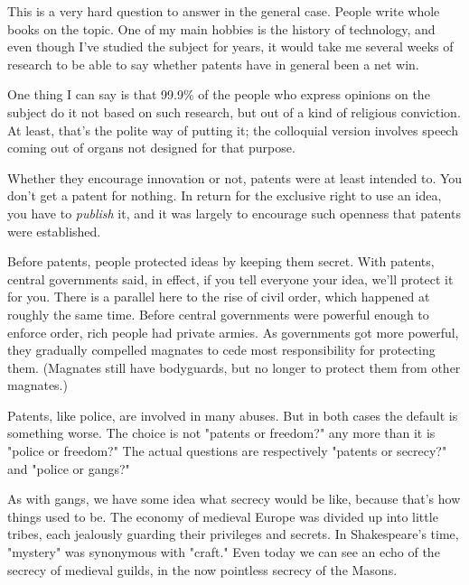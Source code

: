 This is a very hard question to answer
                  in the general case. People write whole books on the topic.
                  One of my main hobbies is the history of technology, and even
                  though I've studied the subject for years, it would take me
                  several weeks of research to be able to say whether patents
                  have in general been a net win.

One thing I can say
                  is that 99.9\% of the people who express opinions on the
                  subject do it not based on such research, but out of a kind of
                  religious conviction. At least, that's the polite way of
                  putting it; the colloquial version involves speech coming out
                  of organs not designed for that purpose.

Whether
                  they encourage innovation or not, patents were at least
                  intended to. You don't get a patent for nothing. In return for
                  the exclusive right to use an idea, you have to
                  \emph{publish} it, and it was largely to encourage such
                  openness that patents were established.

Before
                  patents, people protected ideas by keeping them secret. With
                  patents, central governments said, in effect, if you tell
                  everyone your idea, we'll protect it for you. There is a
                  parallel here to the rise of civil order, which happened at
                  roughly the same time. Before central governments were
                  powerful enough to enforce order, rich people had private
                  armies. As governments got more powerful, they gradually
                  compelled magnates to cede most responsibility for protecting
                  them. (Magnates still have bodyguards, but no longer to
                  protect them from other magnates.)

Patents, like
                  police, are involved in many abuses. But in both cases the
                  default is something worse. The choice is not "patents or
                  freedom?" any more than it is "police or freedom?" The actual
                  questions are respectively "patents or secrecy?" and "police
                  or gangs?"

As with gangs, we have some idea what
                  secrecy would be like, because that's how things used to be.
                  The economy of medieval Europe was divided up into little
                  tribes, each jealously guarding their privileges and secrets.
                  In Shakespeare's time, "mystery" was synonymous with "craft."
                  Even today we can see an echo of the secrecy of medieval
                  guilds, in the now pointless secrecy of the Masons.

